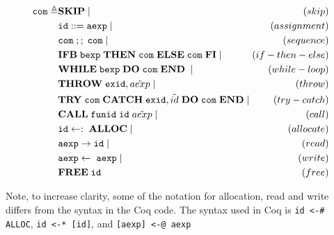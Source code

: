 \begin{equation}
\begin{alignedat}{2}
\verb|com| \triangleq & \textbf{SKIP} \;|\; & (skip) \\&
	\verb|id| ::= \verb|aexp| \;|\; & (assignment) \\&
	\verb|com|\; ;;\; \verb|com| \;|\; & (sequence) \\&
	\textbf{IFB}\; \verb|bexp|\; \textbf{THEN}\; \verb|com|\; \textbf{ELSE}\; \verb|com|\; \textbf{FI} \;|\; & (if-then-else) \\&
	\textbf{WHILE}\; \verb|bexp|\; \textbf{DO}\; \verb|com|\; \textbf{END}\; \;|\; & (while-loop) \\&
	\textbf{THROW}\; \verb|exid|, \tilde{aexp} \;|\; & (throw) \\&
	\textbf{TRY}\; \verb|com|\; \textbf{CATCH}\; \verb|exid|, \tilde{id}\; \textbf{DO}\; \verb|com|\; \textbf{END} \;|\; & (try-catch) \\&
	\textbf{CALL}\; \verb|funid|\; \verb|id|\; \tilde{aexp} \;|\; & (call) \\&
	\verb|id|\leftarrow:\;\textbf{ALLOC}\;|\; & (allocate) \\&
	\verb|aexp| \rightarrow \verb|id|\;|\; & (read) \\&
	\verb|aexp|\leftarrow\;\verb|aexp| \;|\; & (write) \\&
	\textbf{FREE}\;\verb|id| & (free)
\end{alignedat}
\end{equation}

{\scriptsize
Note, to increase clarity, some of the notation for allocation, read and write differs from the syntax in the Coq code. The syntax used in Coq is \verb|id <-# ALLOC|, \verb|id <-* [id]|, and \verb|[aexp] <-@ aexp|
}

